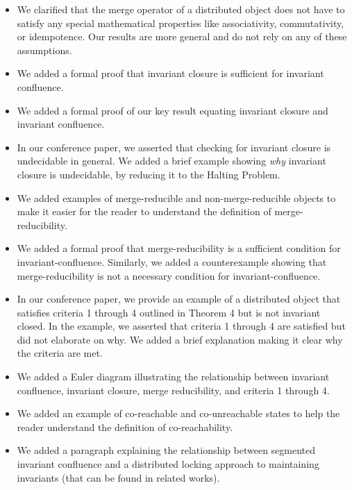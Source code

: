 \documentclass[12pt]{article}
\begin{document}
\begin{itemize}
  \item
    We clarified that the merge operator of a distributed object does not have
    to satisfy any special mathematical properties like associativity,
    commutativity, or idempotence. Our results are more general and do not rely
    on any of these assumptions.

  \item
    We added a formal proof that invariant closure is sufficient for invariant
    confluence.

  \item
    We added a formal proof of our key result equating invariant closure and
    invariant confluence.

  \item
    In our conference paper, we asserted that checking for invariant closure is
    undecidable in general. We added a brief example showing \emph{why}
    invariant closure is undecidable, by reducing it to the Halting Problem.

  \item
    We added examples of merge-reducible and non-merge-reducible objects to
    make it easier for the reader to understand the definition of
    merge-reducibility.

  \item
    We added a formal proof that merge-reducibility is a sufficient condition
    for invariant-confluence. Similarly, we added a counterexample showing that
    merge-reducibility is not a necessary condition for invariant-confluence.

  \item
    In our conference paper, we provide an example of a distributed object that
    satisfies criteria 1 through 4 outlined in Theorem 4 but is not invariant
    closed. In the example, we asserted that criteria 1 through 4 are satisfied
    but did not elaborate on why. We added a brief explanation making it clear
    why the criteria are met.

  \item
    We added a Euler diagram illustrating the relationship between invariant
    confluence, invariant closure, merge reducibility, and criteria 1 through
    4.

  \item
    We added an example of co-reachable and co-unreachable states to help the
    reader understand the definition of co-reachability.

  \item
    We added a paragraph explaining the relationship between segmented
    invariant confluence and a distributed locking approach to maintaining
    invariants (that can be found in related works).


\end{itemize}
\end{document}

